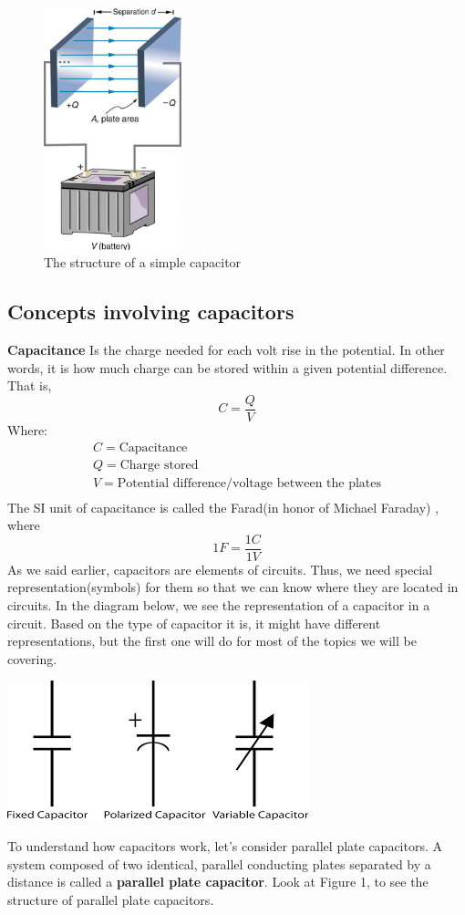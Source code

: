 \documentclass[9pt]{exam}
\begin{document}
	\begin{figure}[htp]
		\centering
		\includegraphics[width=4cm]{structure}
		\caption{The structure of a simple capacitor}
		\label{fig:structure}
	\end{figure}
	
	\subsection*{Concepts involving capacitors}
	\textbf{Capacitance} \newline
	Is the charge needed for each volt rise in the potential. In other words, it is how much charge can be stored within a given potential difference. That is,
	$$	C = \frac{Q}{V} $$
	Where:
	\begin{equation*}
		\begin{split}
			C = \text{Capacitance} \\
			Q = \text{Charge stored} \\
			V = \text{Potential difference/voltage between the plates}\\
		\end{split}
	\end{equation*}
	The SI unit of capacitance is called the Farad(in honor of Michael Faraday)
	, where 
	\begin{equation}
		1 F = \frac{1C}{1V}
	\end{equation}
	As we said earlier, capacitors are elements of circuits. Thus, we need special representation(symbols) for them so that we can know where they are located in circuits. In the diagram below, we see the representation of a capacitor in a circuit. Based on the type of capacitor it is, it might have different representations, but the first one will do for most of the topics we will be covering. 
	\begin{center}
		\includegraphics[scale=0.7]{cap.png}
		\label{fig:cap}
	\end{center}
	To understand how capacitors work, let's consider parallel plate capacitors. A system composed of two identical, parallel conducting plates separated by a distance is called a \textbf{parallel plate capacitor}. Look at Figure 1, to see the structure of parallel plate capacitors.
\end{document}
